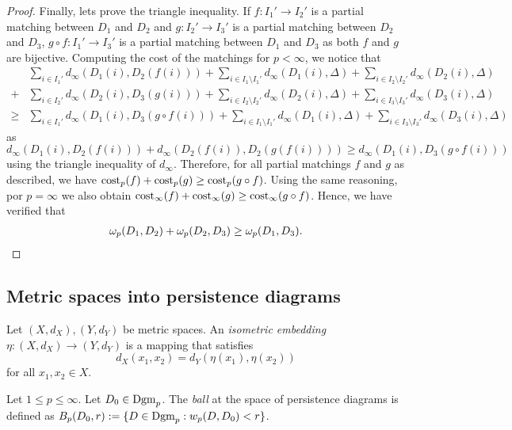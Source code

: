 \begin{proof}
    Finally, lets prove the triangle inequality. If $ f: I_1' \to I_2' $ is a partial matching between $ D_1 $ and $ D_2 $ and $ g: I_2' \to I_3' $ is a partial matching between $ D_2 $ and $ D_3 $, $ g \circ f: I_1' \to I_3' $ is a partial matching between $ D_1 $ and $ D_3 $ as both $ f $ and $ g $ are bijective. Computing the cost of the matchings for $ p < \infty$, we notice that
    \begin{align*}
        &\sum_{i\in I_1'} d_\infty(D_1(i), D_2(f(i))) + \sum_{i\in I_1 \setminus I_1'} d_\infty(D_1(i), \Delta) + \sum_{i\in I_2 \setminus I_2'} d_\infty(D_2(i), \Delta) \\
        + &\sum_{i\in I_2'} d_\infty(D_2(i), D_3(g(i))) + \sum_{i\in I_2 \setminus I_2'} d_\infty(D_2(i), \Delta) + \sum_{i\in I_3 \setminus I_3'} d_\infty(D_3(i), \Delta) \\
        \geq &\sum_{i\in I_1'} d_\infty(D_1(i), D_3(g \circ f(i))) + \sum_{i\in I_1 \setminus I_1'} d_\infty(D_1(i), \Delta) + \sum_{i\in I_3 \setminus I_3'} d_\infty(D_3(i), \Delta)
    \end{align*}
    as $ d_\infty(D_1(i), D_2(f(i))) + d_\infty(D_2(f(i)), D_2(g(f(i)))) \geq d_\infty(D_1(i), D_3(g \circ f(i))) $ using the triangle inequality of $ d_\infty $. Therefore, for all partial matchings $ f $ and $ g $ as described, we have $ \operatorname{cost}_p (f) + \operatorname{cost}_p (g) \geq \operatorname{cost}_p (g \circ f) $. Using the same reasoning, por $ p = \infty $ we also obtain $ \operatorname{cost}_\infty (f) + \operatorname{cost}_\infty (g) \geq \operatorname{cost}_\infty (g \circ f) $. Hence, we have verified that
    \begin{align*}
        \omega_p(D_1, D_2) + \omega_p(D_2, D_3) \geq \omega_p(D_1, D_3).
    \end{align*}
\end{proof}

\subsection{Metric spaces into persistence diagrams} \label{sec:embedding}
\begin{definition}
    Let $ (X, d_X), (Y, d_Y) $ be metric spaces. An {\it isometric embedding} $ \eta: (X, d_X) \to (Y, d_Y) $ is a mapping that satisfies
    $$
        d_X(x_1, x_2) = d_Y(\eta(x_1), \eta(x_2))
    $$
    for all $x_1, x_2 \in X$.
\end{definition}

\begin{definition}
    Let $ 1\leq p \leq \infty $. Let $ D_0 \in \operatorname{Dgm}_p $. The {\it ball} at the space of persistence diagrams is defined as $ B_p(D_0, r) := \{D \in \operatorname{Dgm}_p : w_p(D, D_0) < r \} $.
\end{definition}

